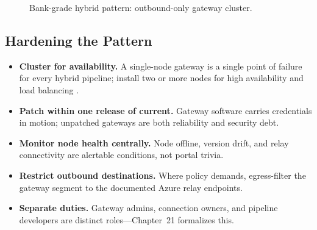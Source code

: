 \begin{figure}[H]
    \centering
    \caption{Bank-grade hybrid pattern: outbound-only gateway cluster.}
    \label{fig:chapter11-bank}
\end{figure}

\subsection{Hardening the Pattern}
\begin{itemize}
    \item \textbf{Cluster for availability.} A single-node gateway is a single point of failure for every hybrid pipeline; install two or more nodes for high availability and load balancing \cite{microsoftOnPremGateway}.
    \item \textbf{Patch within one release of current.} Gateway software carries credentials in motion; unpatched gateways are both reliability and security debt.
    \item \textbf{Monitor node health centrally.} Node offline, version drift, and relay connectivity are alertable conditions, not portal trivia.
    \item \textbf{Restrict outbound destinations.} Where policy demands, egress-filter the gateway segment to the documented Azure relay endpoints.
    \item \textbf{Separate duties.} Gateway admins, connection owners, and pipeline developers are distinct roles---Chapter~21 formalizes this.
\end{itemize}

